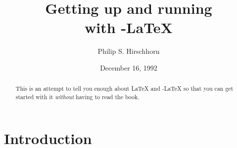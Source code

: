\theoremstyle{definition}
\newtheorem{defn}[thm]{Definition}

\theoremstyle{remark}
\newtheorem{rem}[thm]{Remark}
\newtheorem{ex}[thm]{Example}
\newtheorem{notation}{Notation}
\renewcommand{\thenotation}{}  %
\newtheorem{terminology}{Terminology}
\renewcommand{\theterminology}{}  %








\title[Running \AmS-\LaTeX]
{Getting up and running\\
with \AmS-\LaTeX}

\author{Philip S. Hirschhorn}

\address{Department of Mathematics\\
         Wellesley College\\
         Wellesley, MA 02181}



\date{December 16, 1992}



\maketitle

\begin{abstract}
This is an attempt to tell you enough about \LaTeX{} and \AmS-\LaTeX{}
so that you can get started with it {\em without\/} having to read
the book.
\end{abstract}





\tableofcontents
\section{Introduction}

